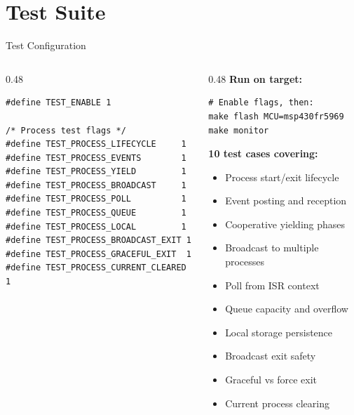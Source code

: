 \documentclass[aspectratio=169, 10pt]{beamer}
\begin{document}
\section{Test Suite}

\begin{frame}[fragile]{Test Configuration}
\begin{columns}[T]
\begin{column}{0.48\textwidth}
\begin{lstlisting}[style=cstyle, title={tests/tiku\_test\_config.h}]
#define TEST_ENABLE 1

/* Process test flags */
#define TEST_PROCESS_LIFECYCLE     1
#define TEST_PROCESS_EVENTS        1
#define TEST_PROCESS_YIELD         1
#define TEST_PROCESS_BROADCAST     1
#define TEST_PROCESS_POLL          1
#define TEST_PROCESS_QUEUE         1
#define TEST_PROCESS_LOCAL         1
#define TEST_PROCESS_BROADCAST_EXIT 1
#define TEST_PROCESS_GRACEFUL_EXIT  1
#define TEST_PROCESS_CURRENT_CLEARED 1
\end{lstlisting}
\end{column}

\begin{column}{0.48\textwidth}
\textbf{Run on target:}
\begin{lstlisting}[style=cstyle, basicstyle=\ttfamily\tiny]
# Enable flags, then:
make flash MCU=msp430fr5969
make monitor
\end{lstlisting}

\vspace{0.5em}
\textbf{10 test cases covering:}
\begin{itemize}
  \item Process start/exit lifecycle
  \item Event posting and reception
  \item Cooperative yielding phases
  \item Broadcast to multiple processes
  \item Poll from ISR context
  \item Queue capacity and overflow
  \item Local storage persistence
  \item Broadcast exit safety
  \item Graceful vs force exit
  \item Current process clearing
\end{itemize}
\end{column}
\end{columns}
\end{frame}
\end{document}

